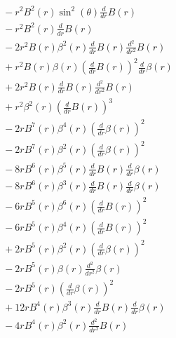 \documentclass[11pt,a4paper]{article}
\begin{document}
\begin{align*}
  &\quad - r^{2} B^{2}{\left(r \right)} \sin^{2}{\left(\theta \right)} \frac{d}{d r} B{\left(r \right)} \\
  &\quad - r^{2} B^{2}{\left(r \right)} \frac{d}{d r} B{\left(r \right)} \\
  &\quad - 2 r^{2} B{\left(r \right)} \beta^{2}{\left(r \right)} \frac{d}{d r} B{\left(r \right)} \frac{d^{2}}{d r^{2}} B{\left(r \right)} \\
  &\quad + r^{2} B{\left(r \right)} \beta{\left(r \right)} \left(\frac{d}{d r} B{\left(r \right)}\right)^{2} \frac{d}{d r} \beta{\left(r \right)} \\
  &\quad + 2 r^{2} B{\left(r \right)} \frac{d}{d r} B{\left(r \right)} \frac{d^{2}}{d r^{2}} B{\left(r \right)} \\
  &\quad + r^{2} \beta^{2}{\left(r \right)} \left(\frac{d}{d r} B{\left(r \right)}\right)^{3} \\
  &\quad - 2 r B^{7}{\left(r \right)} \beta^{4}{\left(r \right)} \left(\frac{d}{d r} \beta{\left(r \right)}\right)^{2} \\
  &\quad - 2 r B^{7}{\left(r \right)} \beta^{2}{\left(r \right)} \left(\frac{d}{d r} \beta{\left(r \right)}\right)^{2} \\
  &\quad - 8 r B^{6}{\left(r \right)} \beta^{5}{\left(r \right)} \frac{d}{d r} B{\left(r \right)} \frac{d}{d r} \beta{\left(r \right)} \\
  &\quad - 8 r B^{6}{\left(r \right)} \beta^{3}{\left(r \right)} \frac{d}{d r} B{\left(r \right)} \frac{d}{d r} \beta{\left(r \right)} \\
  &\quad - 6 r B^{5}{\left(r \right)} \beta^{6}{\left(r \right)} \left(\frac{d}{d r} B{\left(r \right)}\right)^{2} \\
  &\quad - 6 r B^{5}{\left(r \right)} \beta^{4}{\left(r \right)} \left(\frac{d}{d r} B{\left(r \right)}\right)^{2} \\
  &\quad + 2 r B^{5}{\left(r \right)} \beta^{2}{\left(r \right)} \left(\frac{d}{d r} \beta{\left(r \right)}\right)^{2} \\
  &\quad - 2 r B^{5}{\left(r \right)} \beta{\left(r \right)} \frac{d^{2}}{d r^{2}} \beta{\left(r \right)} \\
  &\quad - 2 r B^{5}{\left(r \right)} \left(\frac{d}{d r} \beta{\left(r \right)}\right)^{2} \\
  &\quad + 12 r B^{4}{\left(r \right)} \beta^{3}{\left(r \right)} \frac{d}{d r} B{\left(r \right)} \frac{d}{d r} \beta{\left(r \right)} \\
  &\quad - 4 r B^{4}{\left(r \right)} \beta^{2}{\left(r \right)} \frac{d^{2}}{d r^{2}} B{\left(r \right)} \\

\end{align*}
\end{document}
